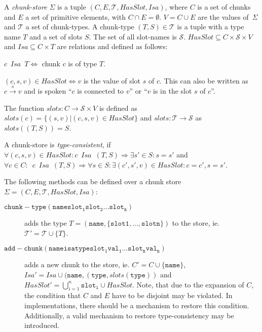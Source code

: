 \begin{definition}
A \emph{chunk-store} $\Sigma$ is a tuple $(C,E,\mathcal{T},HasSlot,Isa)$, where $C$ is a set of chunks and $E$ a set of primitive elements, with $C \cap E = \emptyset$. $V = C \cup E$ are the values of~$\Sigma$ and $\mathcal{T}$ a set of chunk-types. A chunk-type $(T,S) \in \mathcal{T}$ is a tuple with a type name $T$ and a set of slots $S$. The set of all slot-names is $\mathcal{S}$. $HasSlot \subseteq C \times \mathcal{S} \times V$ and $Isa \subseteq C \times T$ are relations and defined as follows:

$c \enspace Isa \enspace T \Leftrightarrow$ chunk $c$ is of type $T$.


$(c,s,v) \in HasSlot \Leftrightarrow v$ is the value of slot $s$ of $c$. This can also be written as $c \overset{s}{\longrightarrow} v$ and is spoken ``$c$ is connected to $v$'' or ``$v$ is in the slot $s$ of $c$''.

The function $slots: C \rightarrow \mathcal{S} \times V$ is defined as $slots(c) = \{ (s,v) | (c,s,v) \in HasSlot \}$ and $slots: \mathcal{T} \rightarrow \mathcal{S}$ as $slots((T,S)) = S$.

A chunk-store is \emph{type-consistent}, if $\forall(c,s,v) \in HasSlot: c \enspace Isa \enspace (T,S) \Rightarrow \exists s' \in S: s=s'$ and $\forall c \in C: \enspace c \enspace Isa \enspace (T,S) \Rightarrow \forall s \in S: \exists (c',s',v) \in HasSlot: c=c', s=s'$.
\end{definition}


\begin{definition}
\label{def:abstract_methods_chunk_store}
The following methods can be defined over a chunk store $\Sigma = (C, E, \mathcal{T}, HasSlot, Isa)$:

\begin{description}
 \item[$\mathtt{chunk-type(name slot_1 slot_2 \dots slot_n)}$] adds the type $T = (\mathtt{name},\{\mathtt{slot1}, \dots, \mathtt{slotn}\})$ to the store, ie. $\mathcal{T'} = \mathcal{T} \cup \{T\}$. 
 \item[$\mathtt{add-chunk(name isa type slot_1 val_1 \dots slot_n val_n)}$] adds a new chunk to the store, ie. $C' = C \cup \{ \mathtt{name} \}$, $Isa' = Isa \cup (\mathtt{name}, (\mathtt{type}, slots(\mathtt{type}))$ and $HasSlot' = \bigcup_{i = 1}^n{\mathtt{slot_i}} \cup HasSlot.$ Note, that due to the expansion of $C$, the condition that $C$ and $E$ have to be disjoint may be violated. In implementations, there should be a mechanism to restore this condition. Additionally, a valid mechanism to restore type-consistency may be introduced.
\end{description} 
\end{definition}

